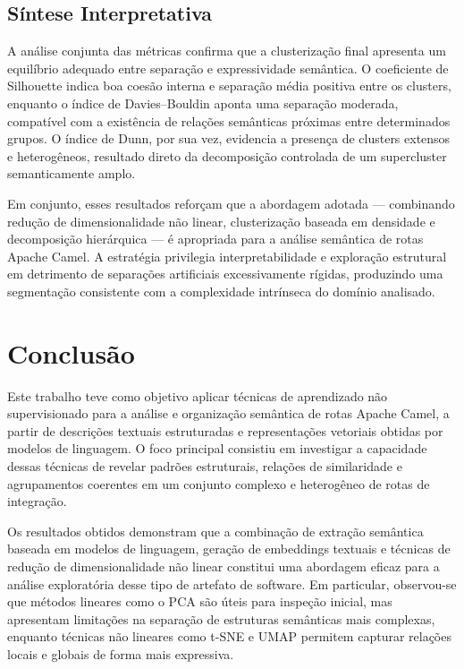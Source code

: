 \documentclass[12pt,a4paper]{article}
\begin{document}
\subsection{Síntese Interpretativa}

A análise conjunta das métricas confirma que a clusterização final apresenta um equilíbrio adequado entre separação e expressividade semântica. O coeficiente de Silhouette indica boa coesão interna e separação média positiva entre os clusters, enquanto o índice de Davies–Bouldin aponta uma separação moderada, compatível com a existência de relações semânticas próximas entre determinados grupos. O índice de Dunn, por sua vez, evidencia a presença de clusters extensos e heterogêneos, resultado direto da decomposição controlada de um supercluster semanticamente amplo.

Em conjunto, esses resultados reforçam que a abordagem adotada — combinando redução de dimensionalidade não linear, clusterização baseada em densidade e decomposição hierárquica — é apropriada para a análise semântica de rotas Apache Camel. A estratégia privilegia interpretabilidade e exploração estrutural em detrimento de separações artificiais excessivamente rígidas, produzindo uma segmentação consistente com a complexidade intrínseca do domínio analisado.



\section{Conclusão}

Este trabalho teve como objetivo aplicar técnicas de aprendizado não supervisionado para a análise e organização semântica de rotas Apache Camel, a partir de descrições textuais estruturadas e representações vetoriais obtidas por modelos de linguagem. O foco principal consistiu em investigar a capacidade dessas técnicas de revelar padrões estruturais, relações de similaridade e agrupamentos coerentes em um conjunto complexo e heterogêneo de rotas de integração.

Os resultados obtidos demonstram que a combinação de extração semântica baseada em modelos de linguagem, geração de embeddings textuais e técnicas de redução de dimensionalidade não linear constitui uma abordagem eficaz para a análise exploratória desse tipo de artefato de software. Em particular, observou-se que métodos lineares como o PCA são úteis para inspeção inicial, mas apresentam limitações na separação de estruturas semânticas mais complexas, enquanto técnicas não lineares como t-SNE e UMAP permitem capturar relações locais e globais de forma mais expressiva.
\end{document}
